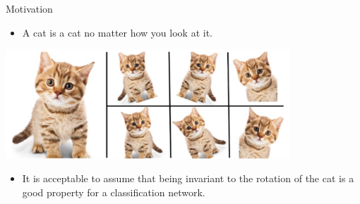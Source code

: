 \documentclass{beamer}
\begin{document}
\begin{frame}{Motivation}
    \begin{itemize}
        \setlength{\itemsep}{\fill}
        \item A cat is a cat no matter how you look at it.
    \end{itemize}

    \begin{center}
        \includegraphics[width=0.8\textwidth]{../figures/cat.png}
    \end{center}

    \begin{itemize}
        \setlength{\itemsep}{\fill}
        \pause
        \item It is acceptable to assume that being invariant to the rotation of the cat is a good property for a classification network.
    \end{itemize}
\end{frame}
\end{document}

